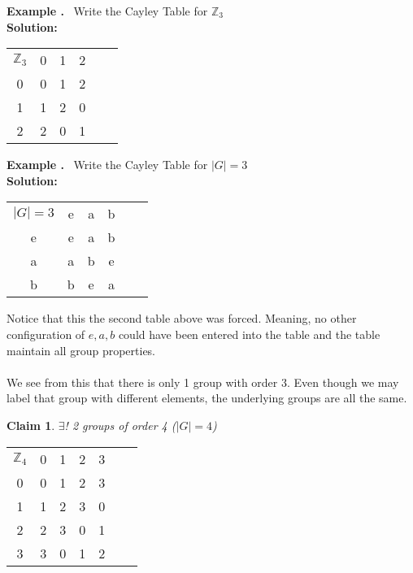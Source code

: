 \documentclass{article}
\newcounter{example}
\newcounter{claim}
\newcounter{solution}
\theoremstyle{claim}
\newtheorem{claim}{Claim}[section]
\newcommand\Example{%
  \stepcounter{example}%
  \textbf{Example \theexample.}~%
  \setcounter{solution}{0}%
}
\newcommand\TheSolution{%
  \textbf{Solution:}\\%
}
\begin{document}
\Example Write the Cayley Table for $\mathbb{Z}_{3}$\\

\TheSolution 
 \begin{center}
\setlength\extrarowheight{3pt}
\begin{tabular}{c | c c c c c}
    $\mathbb{Z}_{3}$ & 0 & 1 & 2  \\
    \cline{1-4}
    0 & 0 & 1 & 2  \\
    1 & 1 & 2 & 0  \\
    2 & 2 & 0 & 1  \\
\end{tabular}
\end{center}

\Example Write the Cayley Table for $|G|=3$\\

\TheSolution 
 \begin{center}

\setlength\extrarowheight{3pt}
\begin{tabular}{c | c c c c c}
    $|G|=3$ & e & a & b  \\
    \cline{1-4}
    e & e & a & b  \\
    a & a & b & e  \\
    b & b & e & a  \\
\end{tabular}
\end{center}
Notice that this the second table above was forced. Meaning, no other configuration of $e,a,b$ could have been entered into the table and the table maintain all group properties.\\\\
We see from this that there is only 1 group with order 3. Even though we may label that group with different elements, the underlying groups are all the same.

\begin{claim}{}
$\exists$! 2 groups of order 4 ($|G|=4$)
\end{claim}

\begin{center}
\setlength\extrarowheight{3pt}
\begin{tabular}{c | c c c c c c}
    $\mathbb{Z}_{4}$ & 0 & 1 & 2 & 3  \\
    \cline{1-5}
    0 & 0 & 1 & 2 & 3  \\
    1 & 1 & 2 & 3 & 0 	\\
    2 & 2 & 3 & 0 & 1	\\
    3 & 3 & 0 & 1 & 2	\\
\end{tabular}
\end{center}
\end{document}
